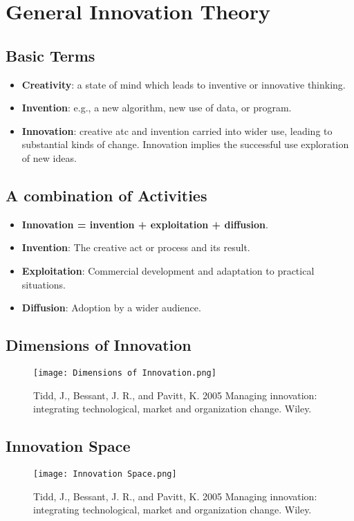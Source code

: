\section{General Innovation Theory}

\subsection{Basic Terms}
\begin{itemize}
	\item \textbf{Creativity}: a state of mind which leads to inventive or innovative thinking.
	\item \textbf{Invention}: e.g., a new algorithm, new use of data, or program.
	\item \textbf{Innovation}: creative atc and invention carried into wider use, leading to substantial kinds of change. Innovation implies the successful use exploration of new ideas.
\end{itemize}

\subsection{A combination of Activities}
\begin{itemize}
	\item \textbf{Innovation = invention + exploitation + diffusion}.
	\item \textbf{Invention}: The creative act or process and its result.
	\item \textbf{Exploitation}: Commercial development and adaptation to practical situations.
	\item \textbf{Diffusion}: Adoption by a wider audience.
\end{itemize}

\subsection{Dimensions of Innovation}
\begin{figure}[H]
	\centering
	\texttt{[image: Dimensions of Innovation.png]}
	\caption{Tidd, J., Bessant, J. R., and Pavitt, K. 2005 Managing innovation: integrating technological, market and organization change. Wiley.}
\end{figure}

\subsection{Innovation Space}
\begin{figure}[H]
	\centering
	\texttt{[image: Innovation Space.png]}
	\caption{Tidd, J., Bessant, J. R., and Pavitt, K. 2005 Managing innovation: integrating technological, market and organization change. Wiley.}
\end{figure}

